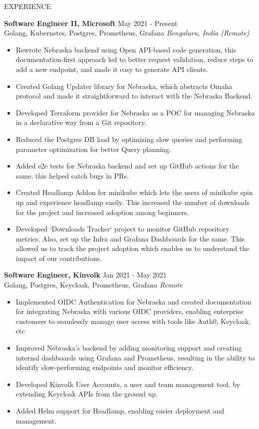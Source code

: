 \documentclass{resume} %
\begin{document}
\begin{rSection}{EXPERIENCE}

\textbf{Software Engineer II, Microsoft} \hfill May 2021 - Present\\
Golang, Kubernetes, Postgres, Prometheus, Grafana \hfill \textit{Bengaluru, India (Remote)} 
 \begin{itemize}
    \itemsep -3pt {} 
\item Rewrote Nebraska backend using Open API-based code generation, this documentation-first approach led to better request validation, reduce steps to add a new endpoint, and made it easy to generate API clients.
\item Created Golang Updater library for Nebraska, which abstracts Omaha protocol and made it straightforward to interact with the Nebraska Backend.
\item Developed Terraform provider for Nebraska as a POC for managing Nebraska in a declarative way from a Git repository.
\item Reduced the Postgres DB load by optimizing slow queries and performing parameter optimization for better Query planning.
\item Added e2e tests for Nebraska backend and set up GitHub actions for the same, this helped catch bugs in PRs.
\item Created Headlamp Addon for minikube which lets the users of minikube spin up and experience headlamp easily. This increased the number of downloads for the project and increased adoption among beginners.
\item Developed `Downloads Tracker` project to monitor GitHub repository metrics. Also, set up the Infra and Grafana Dashboards for the same. This allowed us to track the project adoption which enables us to understand the impact of our contributions.
 \end{itemize}
 
\textbf{Software Engineer, Kinvolk} \hfill Jan 2021 - May 2021\\
Golang, Postgres, Keycloak, Prometheus, Grafana \hfill \textit{Remote} 
 \begin{itemize}
    \itemsep -3pt {} 
\item Implemented OIDC Authentication for Nebraska and created documentation for integrating Nebraska with various OIDC providers, enabling enterprise customers to seamlessly manage user access with tools like Auth0, Keycloak, etc
\item Improved Nebraska's backend by adding monitoring support and creating internal dashboards using Grafana and Prometheus, resulting in the ability to identify slow-performing endpoints and monitor efficiency.
\item Developed Kinvolk User Accounts, a user and team management tool, by extending Keycloak APIs from the ground up.
\item Added Helm support for Headlamp, enabling easier deployment and management.
 \end{itemize}



\end{rSection}
\end{document}
